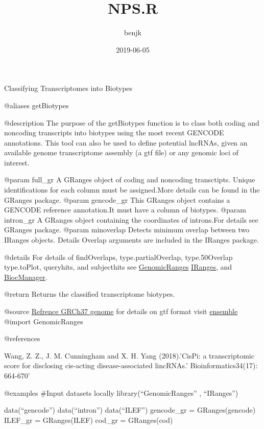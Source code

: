 \documentclass[]{article}
\title{NPS.R}
\author{benjk}
\date{2019-06-05}
\begin{document}
\maketitle

Classifying Transcriptomes into Biotypes

@aliases getBiotypes

@description The purpose of the getBiotypes function is to class both
coding and noncoding transcripts into biotypes using the most recent
GENCODE annotations. This tool can also be used to define potential
lncRNAs, given an available genome transcriptome assembly (a gtf file)
or any genomic loci of interest.

@param full\_gr A GRanges object of coding and noncoding transctipts.
Unique identifications for each column must be assigned.More details can
be found in the GRanges package. @param gencode\_gr This GRanges object
contains a GENCODE reference annotation.It must have a column of
biotypes. @param intron\_gr A GRanges object containing the coordinates
of introns.For details see GRanges package. @param minoverlap Detects
minimum overlap between two IRanges objects. Details Overlap arguments
are included in the IRanges package.

@details For details of findOverlaps, type.partialOverlap,
type.50Overlap type.toPlot, queryhits, and subjecthits see
\href{https://www.bioconductor.org/packages/release/bioc/html/GenomicRanges.html}{GenomicRanges}
\href{https://www.bioconductor.org/packages/release/bioc/html/IRanges.html}{IRanges},
and \href{http://bioconductor.org/install/index.html}{BiocManager}.

@return Returns the classified transcriptome biotypes.

@source
\href{https://www.gencodegenes.org/human/release_25lift37.html}{Refrence
GRCh37 genome} for details on gtf format visit
\href{https://useast.ensembl.org/info/website/upload/gff.html}{ensemble}
@import GenomicRanges

@references

Wang, Z. Z., J. M. Cunningham and X. H. Yang (2018).'CisPi: a
transcriptomic score for disclosing cis-acting disease-associated
lincRNAs.' Bioinformatics34(17): 664-670'

@examples \#Input datasets locally library(``GenomicRanges'' ,
``IRanges'')

data(``gencode'') data(``intron'') data(``ILEF'') gencode\_gr =
GRanges(gencode) ILEF\_gr = GRanges(ILEF) cod\_gr = GRanges(cod)
\end{document}
